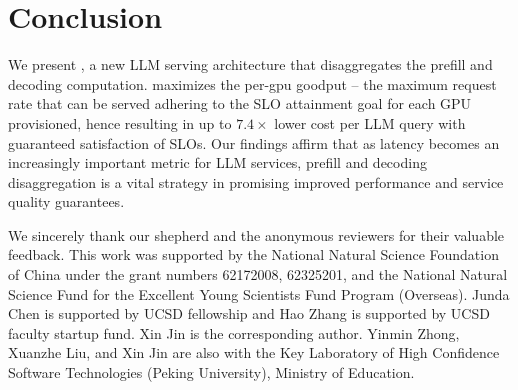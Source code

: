 \section{Conclusion}
\label{sec:conclusion}
We present \sys, a new LLM serving architecture that disaggregates the prefill and decoding computation. \sys maximizes the per-gpu goodput -- the maximum request rate that can be served adhering to the SLO attainment goal for each GPU provisioned, hence resulting in up to $7.4\times$ lower cost per LLM query with guaranteed satisfaction of SLOs. 
Our findings affirm that as latency becomes an increasingly important metric for LLM services, prefill and decoding disaggregation is a vital strategy in promising improved performance and service quality guarantees.

 We sincerely thank our shepherd and
the anonymous reviewers for their valuable feedback. This work was
supported by the National Natural Science Foundation of China under the grant numbers
62172008, 62325201, and the National Natural Science Fund for the Excellent Young Scientists Fund
Program (Overseas). Junda Chen is supported by UCSD fellowship and Hao Zhang is supported by UCSD faculty startup fund. Xin Jin is
the corresponding author. Yinmin Zhong, Xuanzhe Liu, and Xin Jin are
also with the Key Laboratory of High Confidence Software Technologies (Peking
University), Ministry of Education.